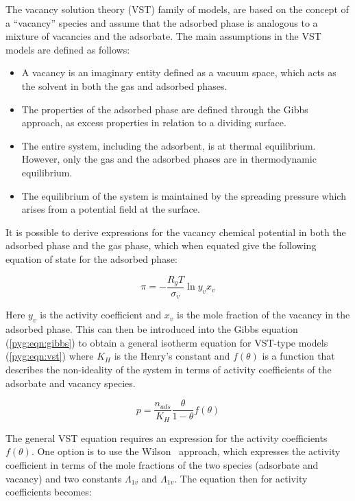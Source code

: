 The vacancy solution theory (VST) family of models, 
are based on the concept of a “vacancy” species and 
assume that the adsorbed phase is analogous to a mixture of
vacancies and the adsorbate. The main assumptions in the
VST models are defined as follows:

\begin{itemize}

	\item A vacancy is an imaginary entity defined as a vacuum
	      space, which acts as the solvent in both the gas and adsorbed
	      phases.
	\item The properties of the adsorbed phase are defined through
		  the Gibbs approach, as excess properties in relation to
		  a dividing surface.
	\item The entire system, including the adsorbent, is at
		  thermal equilibrium. However, only the gas and the adsorbed 
		  phases are in thermodynamic equilibrium.
	\item The equilibrium of the system is maintained by the
		  spreading pressure which arises from a potential field 
		  at the surface.

\end{itemize}

It is possible to derive expressions for the vacancy chemical
potential in both the adsorbed phase and the gas phase, which when
equated give the following equation of state for the adsorbed phase:

\begin{equation}
	\pi = - \frac{R_g T}{\sigma_v} \ln{y_v x_v}
\end{equation}

Here \(y_v\) is the activity coefficient and \(x_v\) is the mole
fraction of the vacancy in the adsorbed phase.
This can then be introduced into the Gibbs equation (\autoref{pyg:eqn:gibbs})
to obtain a general isotherm equation for VST-type models 
(\autoref{pyg:eqn:vst}) where \(K_H\) is the Henry’s constant and
\(f(\theta)\) is a function that describes the non-ideality of the
system in terms of activity coefficients of the adsorbate and 
vacancy species.

\begin{equation}\label{pyg:eqn:vst}
	p = \frac{n_{ads}}{K_H} \frac{\theta}{1-\theta} f(\theta)
\end{equation}

The general VST equation requires an expression for the activity
coefficients \(f(\theta)\). One option is to use the
Wilson~\cite{suwanayuenGasAdsorptionIsotherm1980} approach, 
which expresses the activity coefficient in terms
of the mole fractions of the two species (adsorbate and vacancy) and
two constants \(\Lambda_{1v}\) and \(\Lambda_{1v}\). The equation
then for activity coefficients becomes:

